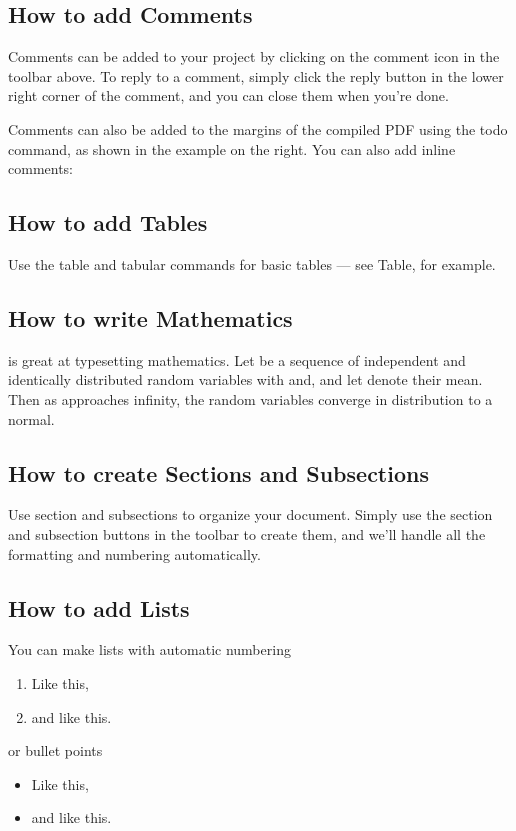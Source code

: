 \documentclass[a4paper]{article}
\begin{document}
\subsection{How to add Comments}

Comments can be added to your project by clicking on the comment icon in the toolbar above. 
To reply to a comment, simply click the reply button in the lower right corner of the comment, and you can close them when you're done.

Comments can also be added to the margins of the compiled PDF using the todo command, as shown in the example on the right. You can also add inline comments:

\subsection{How to add Tables}

Use the table and tabular commands for basic tables --- see Table, for example. 

\subsection{How to write Mathematics}

is great at typesetting mathematics. Let be a sequence of independent and identically distributed random variables with and, and let
denote their mean. Then as approaches infinity, the random variables converge in distribution to a normal.


\subsection{How to create Sections and Subsections}

Use section and subsections to organize your document. Simply use the section and subsection buttons in the toolbar to create them, and we'll handle all the formatting and numbering automatically.

\subsection{How to add Lists}

You can make lists with automatic numbering 

\begin{enumerate}
\item Like this,
\item and like this.
\end{enumerate}
 or bullet points 
\begin{itemize}
\item Like this,
\item and like this.
\end{itemize}
\end{document}
